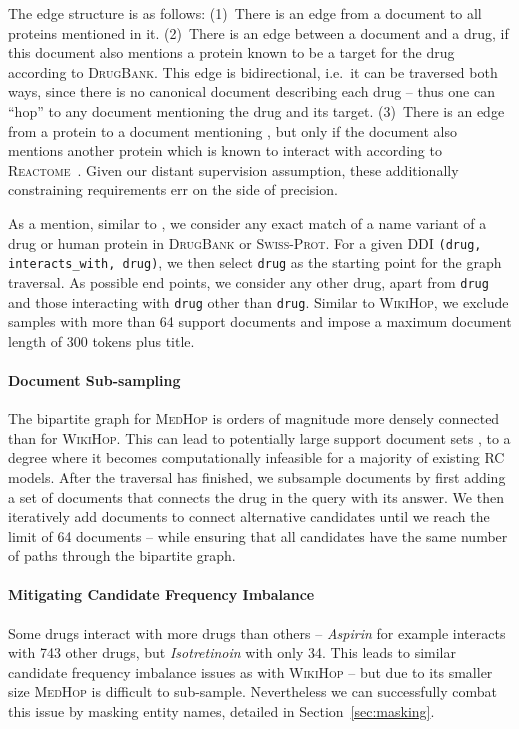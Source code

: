 \documentclass[11pt,letterpaper]{article}
\newcommand{\SwissProt}{\textsc{Swiss-Prot}\xspace}
\newcommand{\DrugBank}{\textsc{DrugBank}\xspace}
\newcommand{\MedHop}{\textsc{MedHop}\xspace}
\newcommand{\WikiHop}{\textsc{WikiHop}\xspace}
\begin{document}
The edge structure is as follows:
(1)~There is an edge from a document to all proteins mentioned in it.
(2)~There is an edge between a document and a drug, if this document also mentions a protein known to be a target for the drug according to \DrugBank.
This edge is bidirectional, i.e.\ it can be traversed both ways, since there is no canonical document describing each drug -- thus one can ``hop'' to any document mentioning the drug and its target.
(3)~There is an edge from a protein  to a document mentioning , but only if the document also mentions another protein  which is known to interact with  according to \textsc{Reactome}~\cite{fabregat2016reactome}.
Given our distant supervision assumption, these additionally constraining requirements err on the side of precision.


As a mention, similar to , we consider any exact match of a name variant of a drug or human protein in \DrugBank or \SwissProt.
For a given DDI \texttt{\smaller(drug,  interacts\_with, drug)}, we then select \texttt{\smaller drug} as the starting point for the graph traversal.
As possible end points, we consider any other drug, apart from \texttt{\smaller drug} and those interacting with \texttt{\smaller drug} other than \texttt{\smaller drug}.
Similar to \WikiHop, we exclude samples with more than 64 support documents and impose a maximum document length of 300 tokens plus title.




\paragraph{Document Sub-sampling}
The bipartite graph for \MedHop is orders of magnitude more densely connected than for \WikiHop.
This can lead to potentially large support document sets , to a degree where it becomes computationally infeasible for a majority of existing RC models.
After the traversal has finished, we subsample documents by first adding a set of documents that connects the drug in the query with its answer.
We then iteratively add documents to connect alternative candidates until we reach the limit of 64 documents -- while ensuring that all candidates have the same number of paths through the bipartite graph.


\paragraph{Mitigating Candidate Frequency Imbalance}
Some drugs interact with more drugs than others -- \textit{Aspirin} for example interacts with 743 other drugs, but \textit{Isotretinoin} with only 34.
This leads to similar candidate frequency imbalance issues as with {\WikiHop} -- but due to its smaller size \MedHop is difficult to sub-sample.
Nevertheless we can successfully combat this issue by masking entity names, detailed in Section~\ref{sec:masking}.
\end{document}
